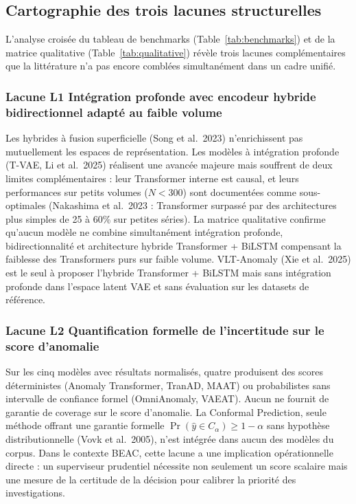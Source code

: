 \documentclass[12pt,a4paper]{article}
\begin{document}
\subsection{Cartographie des trois lacunes structurelles}

L'analyse croisée du tableau de benchmarks (Table~\ref{tab:benchmarks}) et de
la matrice qualitative (Table~\ref{tab:qualitative}) révèle trois lacunes
complémentaires que la littérature n'a pas encore comblées simultanément dans
un cadre unifié.

\subsubsection{Lacune L1  Intégration profonde avec encodeur hybride
bidirectionnel adapté au faible volume}

Les hybrides à fusion superficielle (Song et al.\ 2023) n'enrichissent pas
mutuellement les espaces de représentation. Les modèles à intégration profonde
(T-VAE, Li et al.\ 2025) réalisent une avancée majeure mais souffrent de deux
limites complémentaires : leur Transformer interne est causal, et leurs
performances sur petits volumes ($N < 300$) sont documentées comme
sous-optimales (Nakashima et al.\ 2023 : Transformer surpassé par des
architectures plus simples de 25 à 60\% sur petites séries). La matrice
qualitative confirme qu'aucun modèle ne combine simultanément intégration
profonde, bidirectionnalité et architecture hybride Transformer + BiLSTM
compensant la faiblesse des Transformers purs sur faible volume. VLT-Anomaly
(Xie et al.\ 2025) est le seul à proposer l'hybride Transformer + BiLSTM mais
sans intégration profonde dans l'espace latent VAE et sans évaluation sur les
datasets de référence.

\subsubsection{Lacune L2  Quantification formelle de l'incertitude sur le
score d'anomalie}

Sur les cinq modèles avec résultats normalisés, quatre produisent des scores
déterministes (Anomaly Transformer, TranAD, MAAT) ou probabilistes sans
intervalle de confiance formel (OmniAnomaly, VAEAT). Aucun ne fournit de
garantie de coverage sur le score d'anomalie. La Conformal Prediction, seule
méthode offrant une garantie formelle
$\Pr(\hat{y} \in C_\alpha) \geq 1 - \alpha$ sans hypothèse distributionnelle
(Vovk et al.\ 2005), n'est intégrée dans aucun des modèles du corpus. Dans
le contexte BEAC, cette lacune a une implication opérationnelle directe : un
superviseur prudentiel nécessite non seulement un score scalaire mais une mesure
de la certitude de la décision pour calibrer la priorité des investigations.
\end{document}

